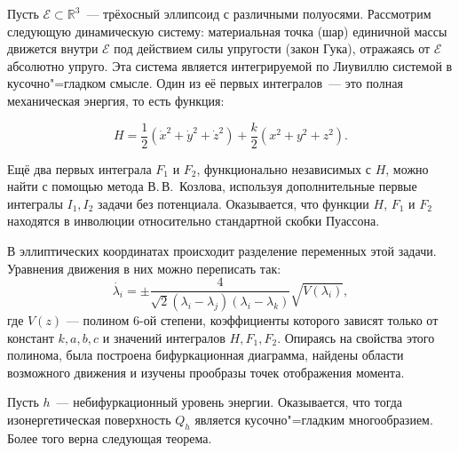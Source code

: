 



\vzmscaption



	Пусть $\mathcal{E}\subset \mathbb{R}^3$~--- трёхосный эллипсоид с различными полуосями. Рассмотрим следующую динамическую систему: материальная точка (шар) единичной массы движется внутри $\mathcal{E}$ под действием силы упругости (закон Гука), отражаясь от $\mathcal{E}$ абсолютно упруго.  Эта система является интегрируемой по Лиувиллю системой в кусочно"=гладком смысле. Один из её первых интегралов~--- это  полная механическая энер\-гия, то есть функция:

	\[
	H=\dfrac{1}{2}(\dot{x}^2+\dot{y}^2+\dot{z}^2)+\dfrac{k}{2}(x^2+y^2+z^2).
	\]

	Ещё два первых интеграла $F_1$ и $F_2$, функционально независимых с $H$, можно найти с помощью метода В.\,В.~Козлова, используя дополнительные первые ин\-те\-гра\-лы $I_1, I_2$ задачи без потенциала. Оказывается, что функции $H$, $F_1$ и $F_2$ находятся в инволюции относительно стандартной скобки Пуассона.

	В эллиптических координатах происходит разделение переменных этой задачи. Уравнения движения в них можно переписать так:
	\[
	\dot{\lambda_i}=\pm\dfrac{4}{\sqrt{2}(\lambda_i-\lambda_j)(\lambda_i-\lambda_k)}\sqrt{V(\lambda_i)},
	\]
	где $V(z)$ --- полином 6-ой степени, коэффициенты которого зависят только от констант $k,a,b,c$ и значений интегралов $H,F_1,F_2$. Опираясь на свойства этого полинома, была построена бифуркационная диаграмма, найдены области возможного движения и изучены прообразы точек отображения момента.

	Пусть $h$~--- небифуркационный уровень энергии. Оказывается, что тогда изонергетическая поверхность $Q_h$ является кусочно"=гладким многообразием. Более того верна следующая теорема.

